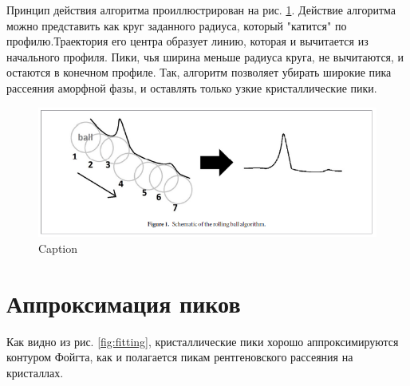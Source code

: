 	Принцип действия алгоритма проиллюстрирован на рис. \ref{fig:ball}. 
	Действие алгоритма можно представить как круг заданного радиуса, который "катится" по профилю.Траектория его центра образует линию, которая и вычитается из начального профиля. Пики, чья ширина меньше радиуса круга, не вычитаются, и остаются в конечном профиле. Так, алгоритм позволяет убирать широкие пика рассеяния аморфной фазы, и оставлять только узкие кристаллические пики.
	
	
	\begin{figure}[ht]
	    \centering
	    \includegraphics[width=\linewidth]{fig/ball.PNG}
	    \caption{Caption}
	    \label{fig:ball}
	\end{figure}



	\section{Аппроксимация пиков}
	
	Как видно из рис. \ref{fig:fitting}, кристаллические пики хорошо аппроксимируются контуром Фойгта, как и полагается пикам рентгеновского рассеяния на кристаллах.
	
